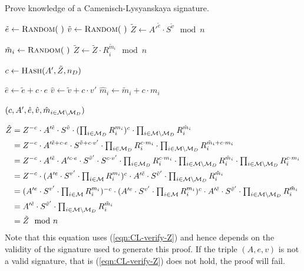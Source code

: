 \begin{algorithm}
  \caption{Prove knowledge of a Camenisch-Lysyanskaya signature.}
  \label{alg:CL-prove-D}
  \addtolength{\baselineskip}{1mm}
  \begin{algorithmic}[1]
      \State $\tilde{e} \gets \Call{Random}{~}$
      \State $\tilde{v} \gets \Call{Random}{~}$
      \State $\tilde{Z} \gets {A'}^{\tilde{e}} \cdot S^{\tilde{v}} \mod n$

        \State $\tilde{m}_i \gets \Call{Random}{~}$
        \State $\tilde{Z} \gets \tilde{Z} \cdot R_i^{\tilde{m}_i} \mod n$
      \EndFor

      \State $c \gets \Call{Hash}{A', \tilde{Z}, n_D}$

      \State $\hat{e} \gets \tilde{e} + c \cdot e$
      \State $\hat{v} \gets \tilde{v} + c \cdot v'$
        \State $\hat{m}_i \gets \tilde{m}_i + c \cdot m_i$
      \EndFor

      \Return $(c, A', \hat{e}, \hat{v}, \hat{m}_{i \in \mathcal{M} \setminus \mathcal{M}_D})$
    \EndFunction
  \end{algorithmic}
\end{algorithm}

\begin{align*}
  \hat{Z}
  & = Z^{-c} \cdot A'^{\hat{e}} \cdot S^{\hat{v}}
    \cdot (\textstyle\prod_{i \in \mathcal{M}_D} R_i^{m_i})^c
    \cdot \textstyle\prod_{i \in \mathcal{M} \setminus \mathcal{M}_D} R_i^{\hat{m}_i} \\
  & = Z^{-c} \cdot A'^{\tilde{e} + c \cdot e} \cdot S^{\tilde{v} + c \cdot v'}
    \cdot \textstyle\prod_{i \in \mathcal{M}_D} R_i^{c \cdot m_i}
    \cdot \textstyle\prod_{i \in \mathcal{M} \setminus \mathcal{M}_D} R_i^{\tilde{m}_i + c \cdot m_i} \\
  & = Z^{-c} \cdot A'^{\tilde{e}} \cdot A'^{c \cdot e}
    \cdot S^{\tilde{v}'} \cdot S^{c \cdot v'}
    \cdot \textstyle\prod_{i \in \mathcal{M}_D} R_i^{c \cdot m_i}
    \cdot \textstyle\prod_{i \in \mathcal{M} \setminus \mathcal{M}_D} R_i^{\tilde{m}_i}
    \cdot \textstyle\prod_{i \in \mathcal{M} \setminus \mathcal{M}_D} R_i^{c \cdot m_i} \\
  & = Z^{-c}
    \cdot (A'^{e} \cdot S^{v'} \cdot \textstyle\prod_{i \in \mathcal{M}} R_i^{m_i})^c
    \cdot A'^{\tilde{e}} \cdot S^{\tilde{v}'}
    \cdot \textstyle\prod_{i \in \mathcal{M} \setminus \mathcal{M}_D} R_i^{\tilde{m}_i} \\
  & = (A'^{e} \cdot S^{v'} \cdot \textstyle\prod_{i \in \mathcal{M}} R_i^{m_i})^{-c}
    \cdot (A'^{e} \cdot S^{v'} \cdot \textstyle\prod_{i \in \mathcal{M}} R_i^{m_i})^c
    \cdot A'^{\tilde{e}} \cdot S^{\tilde{v}'}
    \cdot \textstyle\prod_{i \in \mathcal{M} \setminus \mathcal{M}_D} R_i^{\tilde{m}_i} \\
  & = A'^{\tilde{e}} \cdot S^{\tilde{v}'}
    \cdot \textstyle\prod_{i \in \mathcal{M} \setminus \mathcal{M}_D} R_i^{\tilde{m}_i} \\
  & = \tilde{Z} \mod n
\end{align*}
Note that this equation uses (\ref{eqn:CL-verify-Z}) and hence depends on the
validity of the signature used to generate this proof. If the triple $(A, e, v)$
is not a valid signature, that is (\ref{eqn:CL-verify-Z}) does not hold, the
proof will fail.

